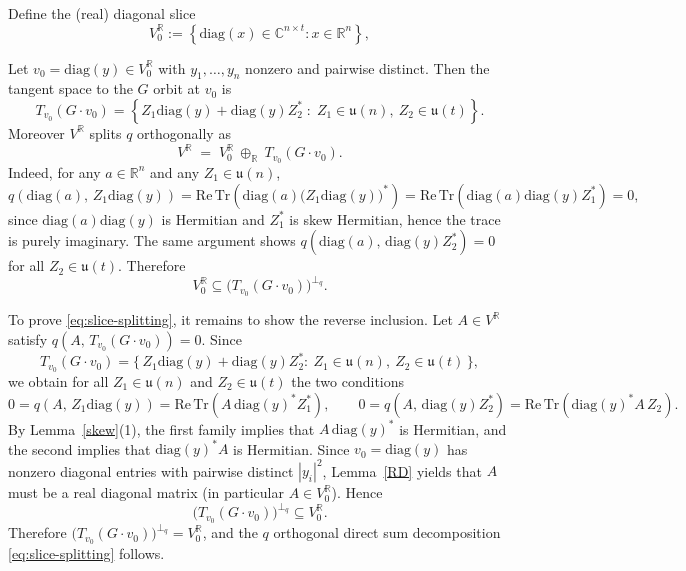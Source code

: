 \documentclass[11pt]{amsart}
\theoremstyle{plain}
\theoremstyle{definition}
\theoremstyle{remark}
\begin{document}
Define the (real) diagonal slice
\[
V_{0}^{\mathbb{R}}
:= \left\{ \mathrm{diag}(x)\in \mathbb{C}^{n\times t} : x\in \mathbb{R}^{n}\right\},
\]

Let $v_{0}=\mathrm{diag}(y)\in V_{0}^{\mathbb{R}}$ with $y_{1},\dots,y_{n}$ nonzero and
pairwise distinct. Then the tangent space to the $G$ orbit at $v_{0}$ is
\[
T_{v_{0}}(G\cdot v_{0})
=\left\{ Z_{1}\mathrm{diag}(y)+\mathrm{diag}(y)Z_{2}^{*} \;:\;
Z_{1}\in \mathfrak{u}(n),\ Z_{2}\in \mathfrak{u}(t)\right\}.
\]
Moreover $V^{\mathbb{R}}$ splits $q$ orthogonally as
\begin{equation}\label{eq:slice-splitting}
V^{\mathbb{R}} \;=\; V_{0}^{\mathbb{R}} \ \oplus_{\mathbb{R}}\ T_{v_{0}}(G\cdot v_{0}).
\end{equation}
Indeed, for any $a\in \mathbb{R}^{n}$ and any $Z_{1}\in \mathfrak{u}(n)$,
\[
q\!\left(\mathrm{diag}(a),\, Z_{1}\mathrm{diag}(y)\right)
= \mathrm{Re}\,\mathrm{Tr}\!\left(\mathrm{diag}(a)\big(Z_{1}\mathrm{diag}(y)\big)^{*}\right)
= \mathrm{Re}\,\mathrm{Tr}\!\left(\mathrm{diag}(a)\mathrm{diag}(y)Z_{1}^{*}\right)=0,
\]
since $\mathrm{diag}(a)\mathrm{diag}(y)$ is Hermitian and $Z_{1}^{*}$ is skew Hermitian, hence
the trace is purely imaginary. The same argument shows
$q(\mathrm{diag}(a),\, \mathrm{diag}(y)Z_{2}^{*})=0$ for all $Z_{2}\in \mathfrak{u}(t)$.
Therefore
\[
V_{0}^{\mathbb{R}} \subseteq \bigl(T_{v_{0}}(G\cdot v_{0})\bigr)^{\perp_q}.
\]

To prove \eqref{eq:slice-splitting}, it remains to show the reverse inclusion.
Let $A\in V^{\mathbb{R}}$ satisfy $q(A,\,T_{v_0}(G\cdot v_0))=0$.  Since
\[
T_{v_{0}}(G\cdot v_{0})
=\{\, Z_{1}\mathrm{diag}(y) + \mathrm{diag}(y)Z_{2}^{*}
:\ Z_{1}\in\mathfrak{u}(n),\ Z_{2}\in\mathfrak{u}(t)\,\},
\]
we obtain for all $Z_1\in\mathfrak{u}(n)$ and $Z_2\in\mathfrak{u}(t)$ the two conditions
\[
0 = q\!\left(A,\,Z_1\mathrm{diag}(y)\right)
= \mathrm{Re}\,\mathrm{Tr}\!\left(A\,\mathrm{diag}(y)^{*} Z_1^{*}\right),
\qquad
0 = q\!\left(A,\,\mathrm{diag}(y)Z_2^{*}\right)
= \mathrm{Re}\,\mathrm{Tr}\!\left(\mathrm{diag}(y)^{*}A\, Z_2\right).
\]
By Lemma~\ref{skew}(1), the first family implies that $A\,\mathrm{diag}(y)^{*}$ is Hermitian,
and the second implies that $\mathrm{diag}(y)^{*}A$ is Hermitian.  Since $v_0=\mathrm{diag}(y)$
has nonzero diagonal entries with pairwise distinct $|y_i|^{2}$, Lemma~\ref{RD} yields that
$A$ must be a real diagonal matrix (in particular $A\in V_{0}^{\mathbb{R}}$). Hence
\[
\bigl(T_{v_{0}}(G\cdot v_{0})\bigr)^{\perp_q} \subseteq V_{0}^{\mathbb{R}}.
\]
Therefore $\bigl(T_{v_{0}}(G\cdot v_{0})\bigr)^{\perp_q}=V_{0}^{\mathbb{R}}$, and the
$q$ orthogonal direct sum decomposition \eqref{eq:slice-splitting} follows.
\end{document}
